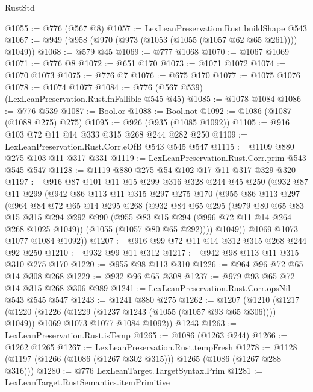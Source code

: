 \begin{lexlean}{RustStd}
\begin{coremodule}
@1055 := @776 (@567 @8)
@1057 := LexLeanPreservation.Rust.buildShape @543
@1067 := @949 (@958 (@970 (@973 (@1053 (@1055 (@1057 @62 @65 @261)))) @1049))
@1068 := @579 @45
@1069 := @777 @1068
@1070 := @1067 @1069
@1071 := @776 @8
@1072 := @651 @170
@1073 := @1071 @1072
@1074 := @1070 @1073
@1075 := @776 @7
@1076 := @675 @170
@1077 := @1075 @1076
@1078 := @1074 @1077
@1084 := @776 (@567 @539) (LexLeanPreservation.Rust.fnFallible @545 @45)
@1085 := @1078 @1084
@1086 := @776 @539
@1087 := Bool.or
@1088 := Bool.not
@1092 := @1086 (@1087 (@1088 @275) @275)
@1095 := @926 (@935 (@1085 @1092))
@1105 := @916 @103 @72 @11 @14 @333 @315 @268 @244 @282 @250
@1109 := LexLeanPreservation.Rust.Corr.eOfB @543 @545 @547
@1115 := @1109 @880 @275 @103 @11 @317 @331
@1119 := LexLeanPreservation.Rust.Corr.prim @543 @545 @547
@1128 := @1119 @880 @275 @54 @102 @17 @11 @317 @329 @320
@1197 := @916
    @87
    @101
    @11
    @15
    @299
    @316
    @328
    @244
    @45
    @250
    (@932
      @87
      @11
      @299
      (@942
        @86
        @113
        @11
        @315
        @297
        @275
        @170
        (@955
          @86
          @113
          @297
          (@964
            @84
            @72
            @65
            @14
            @295
            @268
            (@932
              @84
              @65
              @295
              (@979
                @80
                @65
                @83
                @15
                @315
                @294
                @292
                @990
                (@955 @83 @15 @294 (@996 @72 @11 @14 @264 @268 @1025 @1049))
                (@1055 (@1057 @80 @65 @292))))
            @1049))
        @1069
        @1073
        @1077
        @1084
        @1092))
@1207 := @916 @99 @72 @11 @14 @312 @315 @268 @244 @92 @250
@1210 := @932 @99 @11 @312
@1217 := @942 @98 @113 @11 @315 @310 @275 @170
@1220 := @955 @98 @113 @310
@1226 := @964 @96 @72 @65 @14 @308 @268
@1229 := @932 @96 @65 @308
@1237 := @979 @93 @65 @72 @14 @315 @268 @306 @989
@1241 := LexLeanPreservation.Rust.Corr.opsNil @543 @545 @547
@1243 := @1241 @880 @275
@1262 := @1207
    (@1210
      (@1217
        (@1220 (@1226 (@1229 (@1237 @1243 (@1055 (@1057 @93 @65 @306)))) @1049))
        @1069
        @1073
        @1077
        @1084
        @1092))
    @1243
@1263 := LexLeanPreservation.Rust.isTemp
@1265 := @1086 (@1263 @244)
@1266 := @1262 @1265
@1267 := LexLeanPreservation.Rust.tempFresh
@1278 := @1128 (@1197 (@1266 (@1086 (@1267 @302 @315))) @1265 (@1086 (@1267 @288 @316)))
@1280 := @776 LexLeanTarget.TargetSyntax.Prim
@1281 := LexLeanTarget.RustSemantics.itemPrimitive

\end{coremodule}
\end{lexlean}
